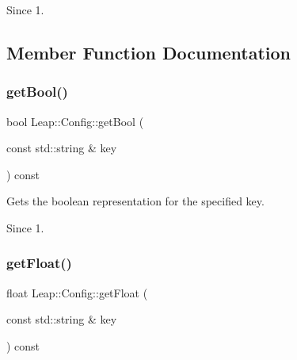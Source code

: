\begin{DoxyCodeInclude}
\end{DoxyCodeInclude}


\begin{DoxySince}{Since}
1. 
\end{DoxySince}


\subsection{Member Function Documentation}
\mbox{\label{class_leap_1_1_config_a3e0138c769238325479fd19ff78ae586}} 
\subsubsection{\texorpdfstring{get\+Bool()}{getBool()}}
{\footnotesize\ttfamily bool Leap\+::\+Config\+::get\+Bool (\begin{DoxyParamCaption}\item[{const std\+::string \&}]{key }\end{DoxyParamCaption}) const\hspace{0.3cm}{\ttfamily [inline]}}

Gets the boolean representation for the specified key.


\begin{DoxyCodeInclude}
\end{DoxyCodeInclude}


\begin{DoxySince}{Since}
1. 
\end{DoxySince}
\mbox{\label{class_leap_1_1_config_a7f1be89c6eb18bec45e9692666b594e9}} 
\subsubsection{\texorpdfstring{get\+Float()}{getFloat()}}
{\footnotesize\ttfamily float Leap\+::\+Config\+::get\+Float (\begin{DoxyParamCaption}\item[{const std\+::string \&}]{key }\end{DoxyParamCaption}) const\hspace{0.3cm}{\ttfamily [inline]}}

